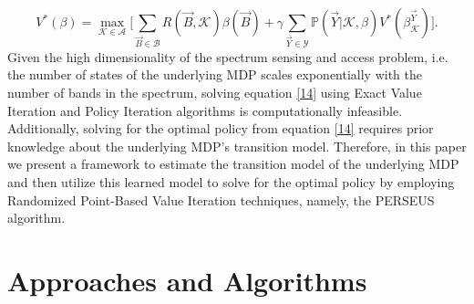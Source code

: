 \documentclass[10pt,twocolumn]{IEEEtran}
\begin{document}
\begin{equation}\label{14}
    V^*(\beta)=\max_{\mathcal{K}\in\mathcal{A}}\Big[\sum_{\vec{B}\in\mathcal{B}}R(\vec{B},\mathcal{K})\beta(\vec{B})+\gamma \sum_{\vec{Y}\in\mathcal{Y}}\mathbb{P}(\vec{Y}|\mathcal{K},\beta)V^*(\beta_{\mathcal{K}}^{\vec{Y}})\Big].
\end{equation}
Given the high dimensionality of the spectrum sensing and access problem, i.e. the number of states of the underlying MDP scales exponentially with the number of bands in the spectrum, solving equation \eqref{14} using Exact Value Iteration and Policy Iteration algorithms is computationally infeasible. Additionally, solving for the optimal policy from equation \eqref{14} requires prior knowledge about the underlying MDP's transition model. Therefore, in this paper we present a framework to estimate the transition model of the underlying MDP and then utilize this learned model to solve for the optimal policy by employing Randomized Point-Based Value Iteration techniques, namely, the PERSEUS algorithm.
\section{Approaches and Algorithms}\label{III}
\end{document}
